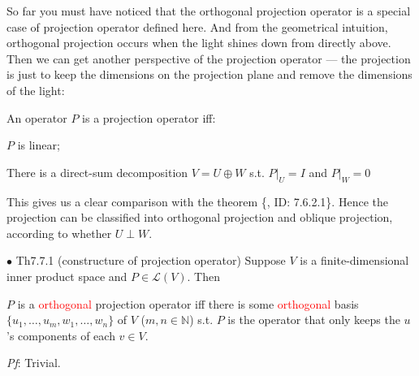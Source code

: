 \documentclass{article}
\begin{document}
\begin{Rmk}{}
    So far you must have noticed that \textcolor{Th}{the orthogonal projection operator is a special case of projection operator defined here.} And from the geometrical intuition, orthogonal projection occurs when the light shines down from directly above. Then we can get another perspective of the projection operator — the projection is just to keep the dimensions on the projection plane and remove the dimensions of the light:
    \textcolor{Th}{An operator $P$ is a projection operator iff:
    \begin{compactenum}
        \item $P$ is linear;
        \item There is a direct-sum decomposition $V = U\oplus W$ s.t. $P|_U = I$ and $P|_W = 0$
    \end{compactenum}    
    }
    This gives us a clear comparison with the theorem \{, ID: 7.6.2.1\}. Hence \textcolor{Df}{the projection can be classified into orthogonal projection and oblique projection, according to whether $U\perp W$.}
\end{Rmk}

\begin{Th}{$\bullet$ Th7.7.1 (constructure of projection operator)}
    Suppose $V$ is a finite-dimensional inner product space and $P\in\mathcal{L}(V)$. Then
    \begin{compactenum}
        \item $P$ is a \textcolor{red}{orthogonal} projection operator iff there is some \textcolor{red}{orthogonal} basis $\{u_1, \dots, u_m, w_1, \dots, w_n\}$ of $V$ ($m, n\in\mathbb{N}$) s.t. $P$ is the operator that only keeps the $u$'s components of each $v\in V$. 
    \end{compactenum}
    \tcblower
    \textit{Pf}: Trivial.
\end{Th}
\end{document}
